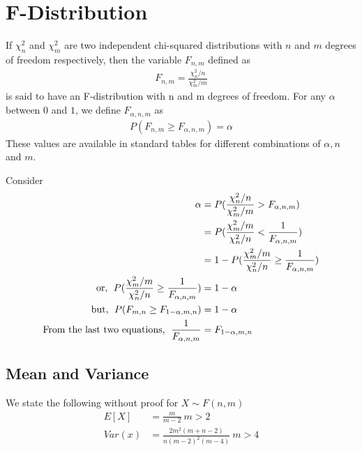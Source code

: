 \documentclass[../probability-notes.tex]{subfiles}
\begin{document}
    \section{F-Distribution}
    If $\chi_{n}^{2}$ and $\chi_{m}^{2}$ are two independent chi-squared distributions with $n$ and $m$ degrees of freedom respectively, then the variable $F_{n,m}$ defined as
    \begin{align*}
        F_{n,m} = \frac{\chi_{n}^{2}/n}{\chi_{m}^{2}/m}
    \end{align*}
    is said to have an F-distribution with n and m degrees of freedom.\newline
    For any $\alpha$ between $0$ and $1$, we define $F_{\alpha, n, m}$ as
    \begin{align*}
        P(F_{n,m} \geq F_{\alpha, n, m}) = \alpha
    \end{align*}
    These values are available in standard tables for different combinations of $\alpha, n$ and $m$.\newline

    Consider
    \begin{align*}
        \alpha &= P(\frac{\chi_{n}^{2}/n}{\chi_{m}^{2}/m} > F_{\alpha, n, m})\\
        &= P(\frac{\chi_{m}^{2}/m}{\chi_{n}^{2}/n} < \frac{1}{F_{\alpha, n, m}})\\
        &= 1 - P(\frac{\chi_{m}^{2}/m}{\chi_{n}^{2}/n} \geq \frac{1}{F_{\alpha, n, m}})\\
        \text{or, \;} P(\frac{\chi_{m}^{2}/m}{\chi_{n}^{2}/n} \geq \frac{1}{F_{\alpha, n, m}}) &= 1 - \alpha\\
        \text{but, \;} P(F_{m,n} \geq F_{1 - \alpha, m, n}) &= 1 - \alpha\\
        \text{From the last two equations, \;} \frac{1}{F_{\alpha, n, m}} &= F_{1-\alpha, m, n}
    \end{align*}

    \subsection{Mean and Variance}
    We state the following without proof for $X \sim F(n,m)$
    \begin{align*}
        E[X] &= \frac{m}{m - 2} \: m > 2\\
        Var(x) &= \frac{2 m^{2}(m + n - 2)}{n(m - 2)^{2}(m - 4)} \: m > 4
    \end{align*}
\end{document}
